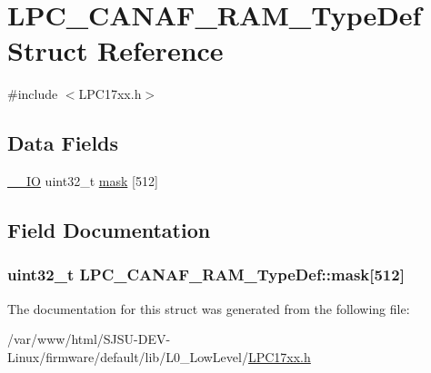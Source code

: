 \hypertarget{structLPC__CANAF__RAM__TypeDef}{}\section{L\+P\+C\+\_\+\+C\+A\+N\+A\+F\+\_\+\+R\+A\+M\+\_\+\+Type\+Def Struct Reference}
\label{structLPC__CANAF__RAM__TypeDef}


{\ttfamily \#include $<$L\+P\+C17xx.\+h$>$}

\subsection*{Data Fields}
\begin{DoxyCompactItemize}
\item 
\hyperlink{LPC17xx_8h_aec43007d9998a0a0e01faede4133d6be}{\+\_\+\+\_\+\+IO} uint32\+\_\+t \hyperlink{structLPC__CANAF__RAM__TypeDef_a4aa976ce2626f44c67748abac073c9b6}{mask} \mbox{[}512\mbox{]}
\end{DoxyCompactItemize}


\subsection{Field Documentation}
\subsubsection[{\texorpdfstring{mask}{mask}}]{ uint32\+\_\+t L\+P\+C\+\_\+\+C\+A\+N\+A\+F\+\_\+\+R\+A\+M\+\_\+\+Type\+Def\+::mask\mbox{[}512\mbox{]}}\hypertarget{structLPC__CANAF__RAM__TypeDef_a4aa976ce2626f44c67748abac073c9b6}{}\label{structLPC__CANAF__RAM__TypeDef_a4aa976ce2626f44c67748abac073c9b6}


The documentation for this struct was generated from the following file\+:\begin{DoxyCompactItemize}
\item 
/var/www/html/\+S\+J\+S\+U-\/\+D\+E\+V-\/\+Linux/firmware/default/lib/\+L0\+\_\+\+Low\+Level/\hyperlink{LPC17xx_8h}{L\+P\+C17xx.\+h}\end{DoxyCompactItemize}
